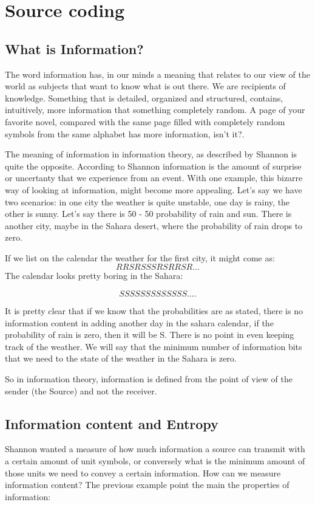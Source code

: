 \chapter{Source coding}

\section{What is Information?}
The word information has, in our minds a meaning that relates to our view of the world as subjects that want to know what is out there. We are recipients of knowledge. Something that is detailed, organized and structured, contains, intuitively, more information that something completely random. A page of your favorite novel, compared with the same page filled with completely random symbols from the same alphabet has more information, isn't it?. 

The meaning of information in information theory, as described by Shannon is quite the opposite. According to Shannon information is the amount of surprise or uncertanty that we experience from an event. With one example, this bizarre way of looking at information, might become more appealing. 
Let's say we have two scenarios: in one city the weather is quite unstable, one day is rainy, the other is sunny.  Let's say there is 50 - 50 probability of rain and sun. There is another city, maybe in the Sahara desert, where the probability of rain drops to zero. 

If we list on the calendar the weather for the first city, it might come as:
\begin{equation}
	RRSRSSSRSRRSR \dots
\end{equation} The calendar looks pretty boring in the Sahara:

\begin{equation}
	SSSSSSSSSSSSS \dots.
\end{equation}

It is pretty clear that if we know that the probabilities are as stated, there is no information content in adding another day in the sahara calendar, if the probability of rain is zero, then it will be S. There is no point in even keeping track of the weather. We will say that the minimum number of information bits that we need to the state of the weather in the Sahara is zero.

So in information theory, information is defined from the point of view of the sender (the Source) and not the receiver.

\section{Information content and Entropy}
Shannon wanted a measure of how much information a source can transmit with a certain amount of unit symbols, or conversely what is the minimum amount of those units we need to convey a certain information. 
How can we measure information content? \newline
The previous example point the main the properties of information:

